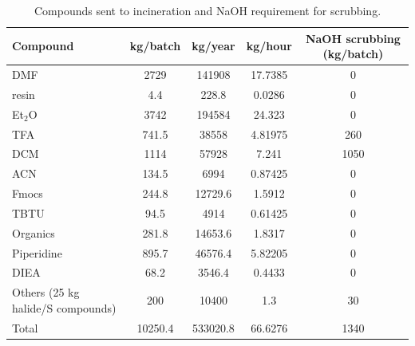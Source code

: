 \begin{table}[htbp]
  \centering
  \caption{Compounds sent to incineration and NaOH requirement for scrubbing.}
  \label{tab:incineration_summary}
  \small
  \begin{tabularx}{\textwidth}{|>{\raggedright\arraybackslash}X|c|c|c|c|}
    \hline
    \textbf{Compound}                 & \textbf{kg/batch} & \textbf{kg/year} & \textbf{kg/hour} & \textbf{NaOH scrubbing (kg/batch)} \\
    \hline
    DMF                               & 2729              & 141908           & 17.7385          & 0                                  \\
    \hline
    resin                             & 4.4               & 228.8            & 0.0286           & 0                                  \\
    \hline
    Et$_2$O                           & 3742              & 194584           & 24.323           & 0                                  \\
    \hline
    TFA                               & 741.5             & 38558            & 4.81975          & 260                                \\
    \hline
    DCM                               & 1114              & 57928            & 7.241            & 1050                               \\
    \hline
    ACN                               & 134.5             & 6994             & 0.87425          & 0                                  \\
    \hline
    Fmocs                             & 244.8             & 12729.6          & 1.5912           & 0                                  \\
    \hline
    TBTU                              & 94.5              & 4914             & 0.61425          & 0                                  \\
    \hline
    Organics                          & 281.8             & 14653.6          & 1.8317           & 0                                  \\
    \hline
    Piperidine                        & 895.7             & 46576.4          & 5.82205          & 0                                  \\
    \hline
    DIEA                              & 68.2              & 3546.4           & 0.4433           & 0                                  \\
    \hline
    Others (25 kg halide/S compounds) & 200               & 10400            & 1.3              & 30                                 \\
    \hline
    Total                             & 10250.4           & 533020.8         & 66.6276          & 1340                               \\
    \hline
  \end{tabularx}
  \normalsize
\end{table}

